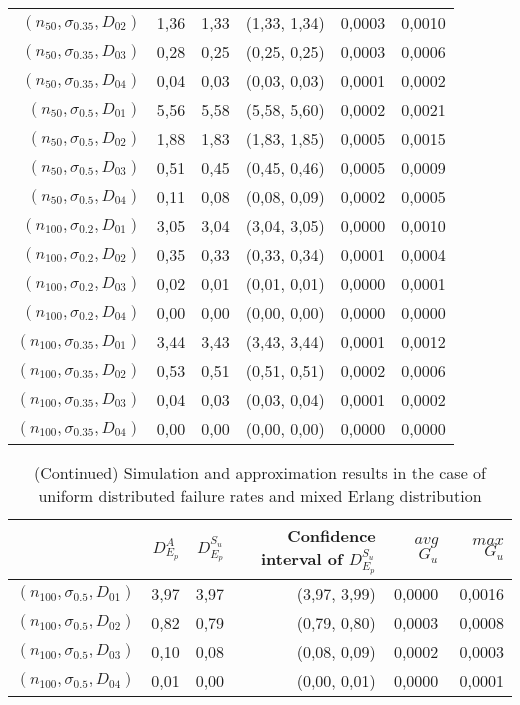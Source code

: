 \documentclass[preprint,12pt]{elsarticle}
\begin{document}
\begin{table}[htbp]
\begin{tabular}{rrrcrr}
 $(n_{50},\sigma_{0.35},D_{02})$ & 1,36  & 1,33  & (1,33, 1,34) & 0,0003 & 0,0010 \\
 $(n_{50},\sigma_{0.35},D_{03})$ & 0,28  & 0,25  & (0,25, 0,25) & 0,0003 & 0,0006 \\
 $(n_{50},\sigma_{0.35},D_{04})$& 0,04  & 0,03  & (0,03, 0,03) & 0,0001 & 0,0002 \\
 $(n_{50},\sigma_{0.5},D_{01})$ & 5,56  & 5,58  & (5,58, 5,60) & 0,0002 & 0,0021 \\
 $(n_{50},\sigma_{0.5},D_{02})$ & 1,88  & 1,83  & (1,83, 1,85) & 0,0005 & 0,0015 \\
 $(n_{50},\sigma_{0.5},D_{03})$  & 0,51  & 0,45  & (0,45, 0,46) & 0,0005 & 0,0009 \\
 $(n_{50},\sigma_{0.5},D_{04})$ & 0,11  & 0,08  & (0,08, 0,09) & 0,0002 & 0,0005 \\
 $(n_{100},\sigma_{0.2},D_{01})$ & 3,05  & 3,04  & (3,04, 3,05) & 0,0000 & 0,0010 \\
 $(n_{100},\sigma_{0.2},D_{02})$  & 0,35  & 0,33  & (0,33, 0,34) & 0,0001 & 0,0004 \\
 $(n_{100},\sigma_{0.2},D_{03})$  & 0,02  & 0,01  & (0,01, 0,01) & 0,0000 & 0,0001 \\
 $(n_{100},\sigma_{0.2},D_{04})$ & 0,00  & 0,00  & (0,00, 0,00) & 0,0000 & 0,0000 \\
  $(n_{100},\sigma_{0.35},D_{01})$  & 3,44  & 3,43  & (3,43, 3,44) & 0,0001 & 0,0012 \\
 $(n_{100},\sigma_{0.35},D_{02})$ & 0,53  & 0,51  & (0,51, 0,51) & 0,0002 & 0,0006 \\
 $(n_{100},\sigma_{0.35},D_{03})$ & 0,04  & 0,03  & (0,03, 0,04) & 0,0001 & 0,0002 \\
 $(n_{100},\sigma_{0.35},D_{04})$& 0,00  & 0,00  & (0,00, 0,00) & 0,0000 & 0,0000 \\
    \bottomrule
    \end{tabular}%
  \label{uniform1}%
\end{table}%
\begin{table}[htbp]
  \centering
  \caption{(Continued) Simulation and approximation results in the case of uniform distributed failure rates and mixed Erlang distribution}
    \begin{tabular}{rrrrrr}
     \toprule
    & $D_{E_{p}}^{A}$ & $D_{E_{p}}^{S_{u}}$ & Confidence interval of $D_{E_{p}}^{S_{u}}$ & $avg$ $G_{u}$ & $max$ $G_{u}$ \\
    \midrule
 $(n_{100},\sigma_{0.5},D_{01})$  & 3,97  & 3,97  & (3,97, 3,99) & 0,0000 & 0,0016 \\
 $(n_{100},\sigma_{0.5},D_{02})$ & 0,82  & 0,79  & (0,79, 0,80) & 0,0003 & 0,0008 \\
 $(n_{100},\sigma_{0.5},D_{03})$& 0,10  & 0,08  & (0,08, 0,09) & 0,0002 & 0,0003 \\
 $(n_{100},\sigma_{0.5},D_{04})$ & 0,01  & 0,00  & (0,00, 0,01) & 0,0000 & 0,0001 \\
    \bottomrule
    \end{tabular}%
  \label{uniform2}%
\end{table}%
\end{document}
